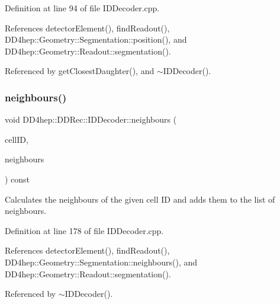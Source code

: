 Definition at line 94 of file I\+D\+Decoder.\+cpp.



References detector\+Element(), find\+Readout(), D\+D4hep\+::\+Geometry\+::\+Segmentation\+::position(), and D\+D4hep\+::\+Geometry\+::\+Readout\+::segmentation().



Referenced by get\+Closest\+Daughter(), and $\sim$\+I\+D\+Decoder().

\hypertarget{class_d_d4hep_1_1_d_d_rec_1_1_i_d_decoder_a6616b016594126f62727c1f6f400412c}{}\label{class_d_d4hep_1_1_d_d_rec_1_1_i_d_decoder_a6616b016594126f62727c1f6f400412c} 
\subsubsection{\texorpdfstring{neighbours()}{neighbours()}}
{\footnotesize\ttfamily void D\+D4hep\+::\+D\+D\+Rec\+::\+I\+D\+Decoder\+::neighbours (\begin{DoxyParamCaption}\item[{const \hyperlink{namespace_d_d4hep_1_1_d_d_rec_af5cecc2e566eeaedb430b92df23971d4}{Cell\+ID} \&}]{cell\+ID,  }\item[{std\+::set$<$ \hyperlink{namespace_d_d4hep_1_1_d_d_rec_af5cecc2e566eeaedb430b92df23971d4}{Cell\+ID} $>$ \&}]{neighbours }\end{DoxyParamCaption}) const}



Calculates the neighbours of the given cell ID and adds them to the list of neighbours. 



Definition at line 178 of file I\+D\+Decoder.\+cpp.



References detector\+Element(), find\+Readout(), D\+D4hep\+::\+Geometry\+::\+Segmentation\+::neighbours(), and D\+D4hep\+::\+Geometry\+::\+Readout\+::segmentation().



Referenced by $\sim$\+I\+D\+Decoder().

\hypertarget{class_d_d4hep_1_1_d_d_rec_1_1_i_d_decoder_ac635e457d5748ceb74f795a6f8ad8a46}{}\label{class_d_d4hep_1_1_d_d_rec_1_1_i_d_decoder_ac635e457d5748ceb74f795a6f8ad8a46} 

